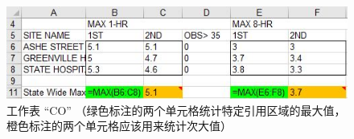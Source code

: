 \begin{figure}[tp]
    \centering
    \includegraphics[width = .95\columnwidth]{figure/figure9.jpg}
    \caption{工作表 ``CO'' （绿色标注的两个单元格统计特定引用区域的最大值，橙色标注的两个单元格应该用来统计次大值）}
    \label{figure9}
\end{figure}